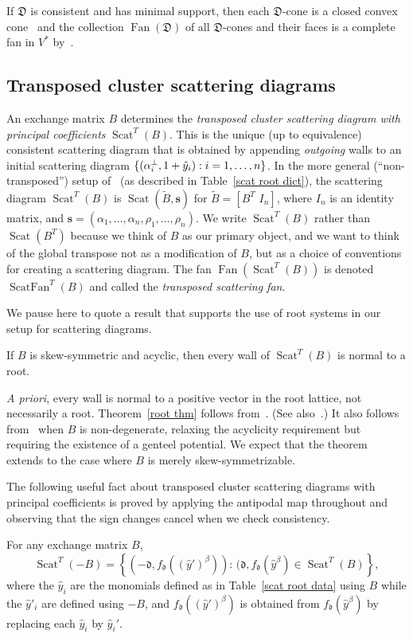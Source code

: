 \documentclass[ALCO,ThmDefs,Unicode,epreuves]{cedram}
\DeclareMathOperator{\Scat}{Scat}
\DeclareMathOperator{\Fan}{Fan}
\DeclareMathOperator{\ScatFan}{ScatFan}
\newcommand{\newword}[1]{\emph{#1}}
\newcommand{\set}[1]{{\left\lbrace #1 \right\rbrace}}
\newcommand{\D}{{\mathfrak D}}
\newcommand{\s}{\mathbf{s}}
\newcommand{\tB}{\tilde{B}}
\renewcommand{\d}{{\mathfrak d}}
\newcommand{\hy}{\hat{y}}
\begin{document}
If $\D$ is consistent and has minimal support, then each $\D$-cone is a closed convex cone~\cite[Proposition~3.5]{scatfan} and the collection $\Fan(\D)$ of all $\D$-cones and their faces is a complete fan in $V^*$ by~\cite[Theorem~3.1]{scatfan}.

\subsection{Transposed cluster scattering diagrams}\label{trans clus sec}
An exchange matrix $B$ determines the \newword{transposed cluster scattering diagram with principal coefficients} $\Scat^T (B)$.
This is the unique (up to equivalence) consistent scattering diagram that is obtained by appending \emph{outgoing} walls to an initial scattering diagram $%
\{(\alpha_i^\perp,1+ \hy_i): i\break =1,\ldots,n\}$.
In the more general (``non-transposed'') setup of~\cite{scatfan} (as described in Table~\ref{scat root dict}), the scattering diagram $\Scat^T(B)$ is $\Scat(\tB,\s)$ for $\tB=[B^T\,\,I_n]$, where $I_n$ is an identity matrix, and $\s=(\alpha_1,\ldots,\alpha_n,\rho_1,\ldots,\rho_n)$.
We write $\Scat^T(B)$ rather than $\Scat(B^T)$ because we think of $B$ as our primary object, and we want to think of the global transpose not as a modification of $B$, but as a choice of conventions for creating a scattering diagram.
The fan $\Fan(\Scat^T(B))$ is denoted $\ScatFan^T(B)$ and called the \newword{transposed scattering fan}.

We pause here to quote a result that supports the use of root systems in our setup for scattering diagrams.

\begin{theorem}\label{root thm}
If $B$ is skew-symmetric and acyclic, then every wall of $\Scat^T(B)$ is normal to a root.
\end{theorem}

\emph{A priori}, every wall is normal to a positive vector in the root lattice, not necessarily a root.
Theorem~\ref{root thm} follows from~\cite[Proposition~10.1]{GHKK}.
(See also~\cite[Example~10.4]{GHKK}.) 
It also follows from~\cite[Lemma~11.4]{Bridgeland} when $B$ is non-degenerate, relaxing the acyclicity requirement but requiring the existence of a genteel potential. 
We expect that the theorem extends to the case where $B$ is merely skew-symmetrizable.

The following useful fact about transposed cluster scattering diagrams with principal coefficients is proved by applying the antipodal map throughout and observing that the sign changes cancel when we check consistency.
\begin{prop}\label{scat antip}
For any exchange matrix $B$, 
\[\Scat^T(-B)=\set{(-\d,f_\d((\hy')^\beta)):\,(\d,f_\d(\hy^\beta)\in\Scat^T(B)},\]
where the $\hy_i$ are the monomials defined as in Table~\ref{scat root data} using $B$ while the $\hy'_i$ are defined using $-B$, and $f_\d((\hy')^\beta)$ is obtained from $f_\d(\hy^\beta)$ by replacing each $\hy_i$ by $\hy_i'$.
\end{prop}
\end{document}
